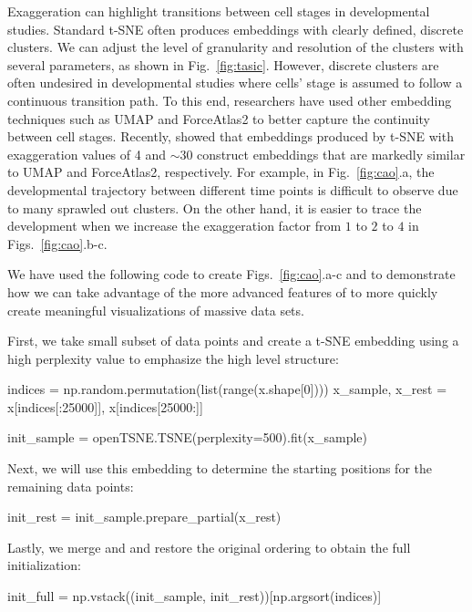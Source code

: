 \documentclass[article]{jss}
\newcommand{\opentsne}{\pkg{openTSNE}\xspace}
\begin{document}
Exaggeration can highlight transitions between cell stages in developmental studies. Standard t-SNE often produces embeddings with clearly defined, discrete clusters. We can adjust the level of granularity and resolution of the clusters with several parameters, as shown in Fig.~\ref{fig:tasic}. However, discrete clusters are often undesired in developmental studies where cells' stage is assumed to follow a continuous transition path. To this end, researchers have used other embedding techniques such as UMAP and ForceAtlas2 to better capture the continuity between cell stages. Recently, \citet{bohm2020unifying} showed that embeddings produced by t-SNE with exaggeration values of 4 and $\sim30$ construct embeddings that are markedly similar to UMAP and ForceAtlas2, respectively. For example, in Fig.~\ref{fig:cao}.a, the developmental trajectory between different time points is difficult to observe due to many sprawled out clusters. On the other hand, it is easier to trace the development when we increase the exaggeration factor from $1$ to $2$ to $4$ in Figs.~\ref{fig:cao}.b-c.

We have used the following code to create Figs.~\ref{fig:cao}.a-c and to demonstrate how we can take advantage of the more advanced features of \opentsne to more quickly create meaningful visualizations of massive data sets.

First, we take small subset of data points and create a t-SNE embedding using a high perplexity value to emphasize the high level structure:
\begin{CodeChunk}
\begin{CodeInput}
indices = np.random.permutation(list(range(x.shape[0])))
x_sample, x_rest = x[indices[:25000]], x[indices[25000:]]

init_sample = openTSNE.TSNE(perplexity=500).fit(x_sample)
\end{CodeInput}
\end{CodeChunk}
Next, we will use this embedding to determine the starting positions for the remaining data points:
\begin{CodeChunk}
\begin{CodeInput}
init_rest = init_sample.prepare_partial(x_rest)
\end{CodeInput}
\end{CodeChunk}
Lastly, we merge  and  and restore the original ordering to obtain the full initialization:
\begin{CodeChunk}
\begin{CodeInput}
init_full = np.vstack((init_sample, init_rest))[np.argsort(indices)]
\end{CodeInput}
\end{CodeChunk}
\end{document}
